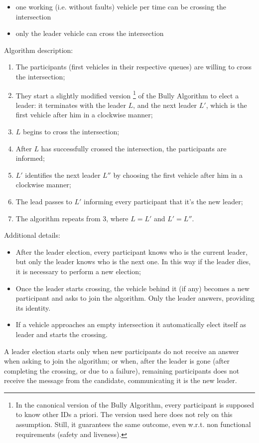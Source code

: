 \documentclass{memoir}
\begin{document}
\begin{itemize}
	\item one working (i.e. without faults) vehicle per time can be crossing the intersection
	\item only the leader vehicle can cross the intersection
\end{itemize}
Algorithm description:
\begin{enumerate}
	\item The participants (first vehicles in their respective queues) are willing to cross the intersection;
	\item They start a slightly modified version \footnote{In the canonical version of the Bully Algorithm, every participant is supposed to know other IDs a priori. The version used here does not rely on this assumption. Still, it guarantees the same outcome, even w.r.t. non functional requirements (safety and liveness).} of the Bully Algorithm to elect a leader: it terminates with the leader $L$, and the next leader $L'$, which is the first vehicle after him in a clockwise manner;
	\item $L$ begins to cross the intersection;
	\item After $L$ has successfully crossed the intersection, the participants are informed;
	\item $L'$ identifies the next leader $L''$ by choosing the first vehicle after him in a clockwise manner;
	\item The lead passes to $L'$ informing every participant that it's the new leader;
	\item The algorithm repeats from 3, where $L = L'$ and $L' = L''$.
\end{enumerate}
Additional details:
\begin{itemize}
	\item After the leader election, every participant knows who is the current leader, but only the leader knows who is the next one. In this way if the leader dies, it is necessary to perform a new election;
	\item Once the leader starts crossing, the vehicle behind it (if any) becomes a new participant and asks to join the algorithm. Only the leader answers, providing its identity.
	\item If a vehicle approaches an empty intersection it automatically elect itself as leader and starts the crossing.
\end{itemize}
A leader election starts only when new participants do not receive an answer when asking to join the algorithm; or when, after the leader is gone (after completing the crossing, or due to a failure), remaining participants does not receive the message from the candidate, communicating it is the new leader.
\end{document}
